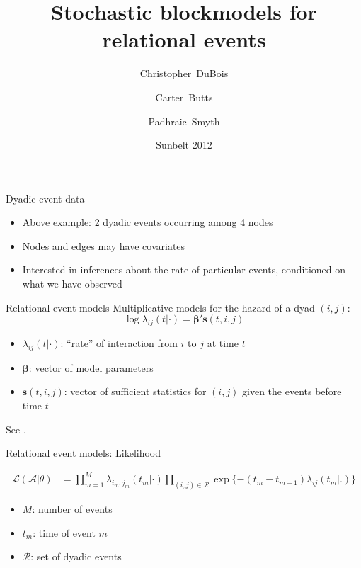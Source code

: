 \documentclass{beamer}
\title{Stochastic blockmodels for relational events}
\author[DuBois, Christopher] %
{Christopher~DuBois\inst{1} \and Carter~Butts\inst{2} \and Padhraic~Smyth\inst{3}}
\institute[] %
{
  \inst{1}%
Department of Statistics \\
University of California, Irvine
  \and
  \inst{2}%
Department of Sociology \\
University of California, Irvine
  \and
  \inst{2}%
Department of Computer Science \\
University of California, Irvine
}
\date[Sunbelt 2012] %
{Sunbelt 2012}
\begin{document}
\frame{\titlepage}

\begin{frame}{Dyadic event data}
\begin{figure}
{
}
\end{figure}

\begin{itemize}
\item Above example: 2 dyadic events occurring among 4 nodes
\item Nodes and edges may have covariates
\item Interested in inferences about the rate of particular events, conditioned on what we have observed
\end{itemize}
\end{frame}

\begin{frame}{Relational event models}
Multiplicative models for the hazard of a dyad $(i,j)$:
$$\log \lambda_{ij}(t | \cdot) = \boldsymbol{\beta}' \mathbf{s}(t,i,j)$$
\begin{itemize}
\item $\lambda_{ij}(t | \cdot)$: ``rate'' of interaction from $i$ to
  $j$ at time $t$
\item $\boldsymbol{\beta}$: vector of model parameters
\item $\mathbf{s}(t,i,j)$: vector of sufficient statistics for $(i,j)$
  given the events before time $t$
\end{itemize}
\vspace{2cm}
\footnotesize{See \cite{Butts2008, Vu2011,Brandes2009,Perry2011,Stadtfeld2010,Stadtfeld2011,Opsahl2011}.}
\end{frame}

\begin{frame}{Relational event models: Likelihood}

\begin{align}
\mathcal{L}(\mathcal{A}|\theta) &= \prod_{m=1}^M \lambda_{i_m,j_m}(t_m|\cdot) \prod_{(i,j) \in \mathcal{R}}\exp\{ - (t_m - t_{m-1}) \lambda_{ij}(t_m | .) \}
\end{align}

\begin{itemize}
\item $M$: number of events
\item $t_m$: time of event $m$
\item $\mathcal{R}$: set of dyadic events
\end{itemize}

\end{frame}
\end{document}
